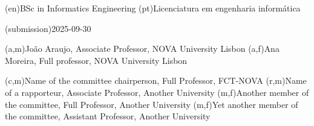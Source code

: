 \ntauthordegree(en){BSc in Informatics Engineering}
\ntauthordegree(pt){Licenciatura em engenharia informática}

\ntdate(submission){2025-09-30}

(a,m){João Araujo, Associate Professor, NOVA University Lisbon}
(a,f){Ana Moreira, Full professor, NOVA University Lisbon}

(c,m){Name of the committee chairperson, Full Professor, FCT-NOVA}
(r,m){Name of a rapporteur, Associate Professor, Another University}
(m,f){Another member of the committee, Full Professor, Another University}
(m,f){Yet another member of the committee, Assistant Professor, Another University}
